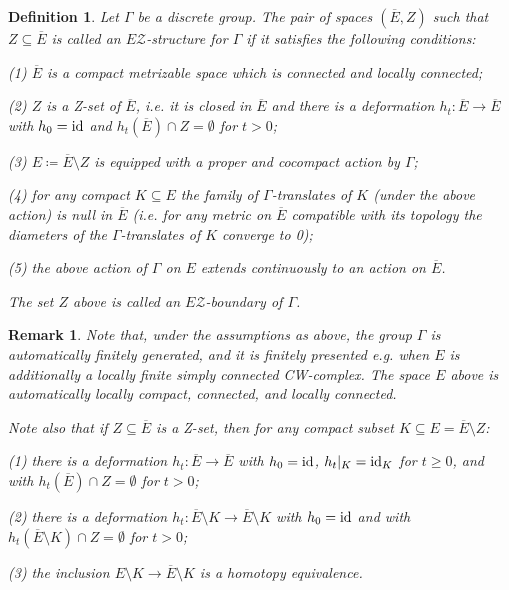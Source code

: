 \documentclass[12pt, a4paper]{article}
\newcommand{\8}{\infty}
\theoremstyle{break}
\newtheorem{rk}[thm]{Remark}
\theoremstyle{defbreak}
\newtheorem{df}[thm]{Definition}
\newcommand{\ol}[1]{\overline{#1}}
\begin{document}
\begin{df}\label{def:EZ-structures} Let $\Gamma$ be a discrete group.
The pair of spaces $(\overline E,Z)$ such that $Z\subseteq \overline E$
is called an $E\mathcal{Z}$-\textit{structure} 
for $\Gamma$ if it satisfies the following conditions:

\item{(1)} $\overline E$ is a compact metrizable space which is connected and locally connected;

\item{(2)} $Z$ is a Z-set of $\overline E$, i.e. it is closed in $\overline E$ 
and there is a deformation
$h_t:\overline E\to\overline E$ with $h_0=\hbox{id}$ and 
$h_t(\overline E)\cap Z=\emptyset$ for $t>0$;

\item{(3)} $E\coloneqq\overline E\setminus Z$ is equipped with a proper and cocompact action by $\Gamma$;

\item{(4)} for any compact $K\subseteq E$ the family of $\Gamma$-translates
of $K$ (under the above action) is {\it null} in $\overline E$ (i.e. for any metric on $\ol E$ compatible with its topology the diameters of the $\Gamma$-translates
of $K$ converge to 0);

\item{(5)} the above action of $\Gamma$ on $E$ extends continuously
to an action on $\overline E$.

The set $Z$ above is called an \textit{$E\mathcal{Z}$-boundary} of $\Gamma$.
\end{df}

\medskip
\begin{rk}\label{rk:Z-set}
Note that, under the assumptions as above, the group $\Gamma$ is automatically finitely generated, and it is finitely presented e.g. when $E$ is additionally a locally finite simply connected CW-complex. The space $E$ above is automatically locally compact, connected, and locally connected.

Note also that if $Z\subseteq\overline E$ is a Z-set, then for any compact subset
$K\subseteq E=\overline E\setminus Z$:

\item{(1)} there is a deformation $h_t:\overline E\to\overline E$ with
$h_0=\hbox{id}$, $h_t|_K=\hbox{id}_K$ for $t\ge0$, and with
$h_t(\overline E)\cap Z=\emptyset$ for $t>0$;

\item{(2)} there is a deformation 
$h_t:\overline E\setminus K\to\overline E\setminus K$ with $h_0=\hbox{id}$
and with $h_t(\overline E\setminus K)\cap Z=\emptyset$ for $t>0$;

\item{(3)} the inclusion $E\setminus K\to\overline E\setminus K$
is a homotopy equivalence.
\end{rk}
\end{document}
